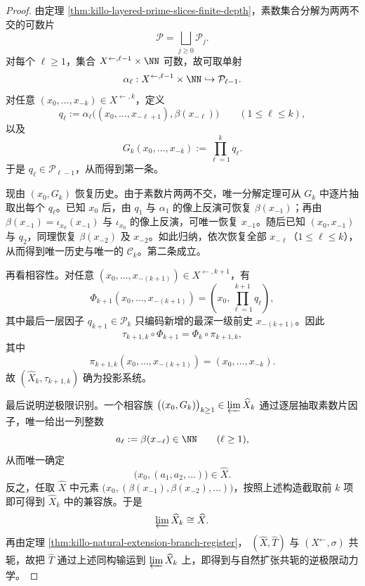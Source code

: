 \begin{proof}
由定理 \ref{thm:killo-layered-prime-slices-finite-depth}，素数集合分解为两两不交的可数片
\[
\mathcal P=\bigsqcup_{j\ge 0}\mathcal P_j.
\]
对每个 \(\ell\ge 1\)，集合 \(X^{\leftarrow,\ell-1}\times\NN\) 可数，故可取单射
\[
\alpha_\ell:X^{\leftarrow,\ell-1}\times\NN\hookrightarrow \mathcal P_{\ell-1}.
\]
对任意 \((x_0,\dots,x_{-k})\in X^{\leftarrow,k}\)，定义
\[
q_\ell:=\alpha_\ell\!\bigl((x_0,\dots,x_{-\ell+1}),\beta(x_{-\ell})\bigr)
\qquad(1\le \ell\le k),
\]
以及
\[
G_k(x_0,\dots,x_{-k}):=\prod_{\ell=1}^{k}q_\ell.
\]
于是 \(q_\ell\in\mathcal P_{\ell-1}\)，从而得到第一条。

现由 \((x_0,G_k)\) 恢复历史。由于素数片两两不交，唯一分解定理可从 \(G_k\) 中逐片抽取出每个 \(q_\ell\)。已知 \(x_0\) 后，由 \(q_1\) 与 \(\alpha_1\) 的像上反演可恢复 \(\beta(x_{-1})\)；再由 \(\beta(x_{-1})=\iota_{x_0}(x_{-1})\) 与 \(\iota_{x_0}\) 的像上反演，可唯一恢复 \(x_{-1}\)。随后已知 \((x_0,x_{-1})\) 与 \(q_2\)，同理恢复 \(\beta(x_{-2})\) 及 \(x_{-2}\)。如此归纳，依次恢复全部 \(x_{-\ell}\)（\(1\le \ell\le k\)），从而得到唯一历史与唯一的 \(\mathcal C_k\)。第二条成立。

再看相容性。对任意 \((x_0,\dots,x_{-(k+1)})\in X^{\leftarrow,k+1}\)，有
\[
\Phi_{k+1}(x_0,\dots,x_{-(k+1)})
=
\left(x_0,\prod_{\ell=1}^{k+1}q_\ell\right),
\]
其中最后一层因子 \(q_{k+1}\in\mathcal P_k\) 只编码新增的最深一级前史 \(x_{-(k+1)}\)。因此
\[
\tau_{k+1,k}\circ \Phi_{k+1}
=
\Phi_k\circ \pi_{k+1,k},
\]
其中
\[
\pi_{k+1,k}(x_0,\dots,x_{-(k+1)})=(x_0,\dots,x_{-k}).
\]
故 \((\widehat X_k,\tau_{k+1,k})\) 确为投影系统。

最后说明逆极限识别。一个相容族 \(\bigl((x_0,G_k)\bigr)_{k\ge 1}\in\varprojlim \widehat X_k\) 通过逐层抽取素数片因子，唯一给出一列整数
\[
a_\ell:=\beta(x_{-\ell})\in\NN
\qquad(\ell\ge 1),
\]
从而唯一确定
\[
\bigl(x_0,(a_1,a_2,\dots)\bigr)\in \widehat X.
\]
反之，任取 \(\widehat X\) 中元素 \(\bigl(x_0,(\beta(x_{-1}),\beta(x_{-2}),\dots)\bigr)\)，按照上述构造截取前 \(k\) 项即可得到 \(\widehat X_k\) 中的兼容族。于是
\[
\varprojlim \widehat X_k\cong \widehat X.
\]
再由定理 \ref{thm:killo-natural-extension-branch-register}，
\((\widehat X,\widehat T)\) 与 \((X^{\leftarrow},\sigma)\) 共轭，故把 \(\widehat T\) 通过上述同构输运到 \(\varprojlim\widehat X_k\) 上，即得到与自然扩张共轭的逆极限动力学。
\end{proof}

